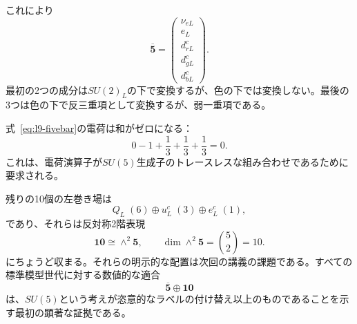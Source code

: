 これにより
\begin{equation}
\overline{\mathbf5}
=
\begin{pmatrix}
\nu_{eL}\\
e_L\\
d^c_{rL}\\
d^c_{gL}\\
d^c_{bL}
\end{pmatrix}.
\label{eq:l9-fivebar}
\end{equation}
最初の2つの成分は\(SU(2)_L\)の下で変換するが、色の下では変換しない。最後の3つは色の下で反三重項として変換するが、弱一重項である。

\begin{classroomqa}
\end{classroomqa}

式~\eqref{eq:l9-fivebar}の電荷は和がゼロになる：
\begin{equation}
0-1+\frac13+\frac13+\frac13=0.
\label{eq:l9-fivebar-charge-sum}
\end{equation}
これは、電荷演算子が\(SU(5)\)生成子のトレースレスな組み合わせであるために要求される。

\begin{classroomqa}
\end{classroomqa}

残りの10個の左巻き場は
\begin{equation}
Q_L\;(6)
\oplus
u^c_L\;(3)
\oplus
e^c_L\;(1),
\end{equation}
であり、それらは反対称2階表現
\begin{equation}
\mathbf{10}\cong\wedge^2\mathbf5,
\qquad
\dim\wedge^2\mathbf5=\binom52=10.
\label{eq:l9-ten-preview}
\end{equation}
にちょうど収まる。それらの明示的な配置は次回の講義の課題である。すべての標準模型世代に対する数値的な適合
\begin{equation}
\overline{\mathbf5}\oplus\mathbf{10}
\end{equation}
は、\(SU(5)\)という考えが恣意的なラベルの付け替え以上のものであることを示す最初の顕著な証拠である。

